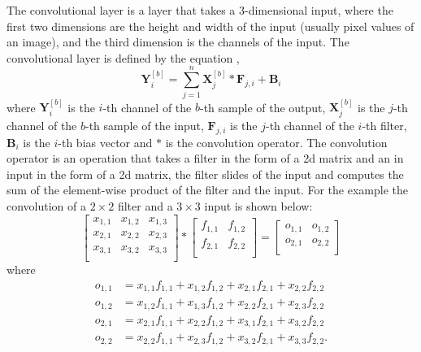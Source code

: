 \documentclass[twocolumn,pra,floatfix]{revtex4-2}
\begin{document}
                The convolutional layer is a layer that takes a 3-dimensional input, where the first two dimensions are the height and width of the input (usually pixel values of an image), and the third dimension is the channels of the input. The convolutional layer is defined by the equation \cite{Solai2018},
                \begin{equation}
                    \mathbf{Y}_{i}^{[b]} = \sum_{j=1}^n \mathbf{X}_{j}^{[b]} \ast  \mathbf{F}_{j,i} + \mathbf{B}_{i}
                \end{equation}
                where $\mathbf{Y}_{i}^{[b]}$ is the $i$-th channel of the $b$-th sample of the output, $\mathbf{X}_{j}^{[b]}$ is the $j$-th channel of the $b$-th sample of the input, $\mathbf{F}_{j,i}$ is the $j$-th channel of the $i$-th filter, $\mathbf{B}_{i}$ is the $i$-th bias vector and $\ast$ is the convolution operator. The convolution operator is an operation that takes a filter in the form of a 2d matrix and an in input in the form of a 2d matrix, the filter slides of the input and computes the sum of the element-wise product of the filter and the input. For the example the convolution of a $2 \times 2$ filter and a $3 \times 3$ input is shown below:
                \begin{equation}
                    \begin{bmatrix}
                        x_{1,1} & x_{1,2} & x_{1,3} \\
                        x_{2,1} & x_{2,2} & x_{2,3} \\
                        x_{3,1} & x_{3,2} & x_{3,3} \\
                    \end{bmatrix} \ast
                    \begin{bmatrix}
                        f_{1,1} & f_{1,2} \\
                        f_{2,1} & f_{2,2} \\
                    \end{bmatrix} =
                    \begin{bmatrix}
                        o_{1,1} & o_{1,2} \\
                        o_{2,1} & o_{2,2} \\
                    \end{bmatrix}
                \end{equation}
                where
                \begin{equation}
                    \begin{aligned}
                        o_{1,1} &= x_{1,1}f_{1,1} + x_{1,2}f_{1,2} + x_{2,1}f_{2,1} + x_{2,2}f_{2,2}\\ 
                        o_{1,2} &= x_{1,2}f_{1,1} + x_{1,3}f_{1,2} + x_{2,2}f_{2,1} + x_{2,3}f_{2,2}\\
                        o_{2,1} &= x_{2,1}f_{1,1} + x_{2,2}f_{1,2} + x_{3,1}f_{2,1} + x_{3,2}f_{2,2}\\
                        o_{2,2} &= x_{2,2}f_{1,1} + x_{2,3}f_{1,2} + x_{3,2}f_{2,1} + x_{3,3}f_{2,2}.\\
                    \end{aligned}
                \end{equation}
\end{document}
